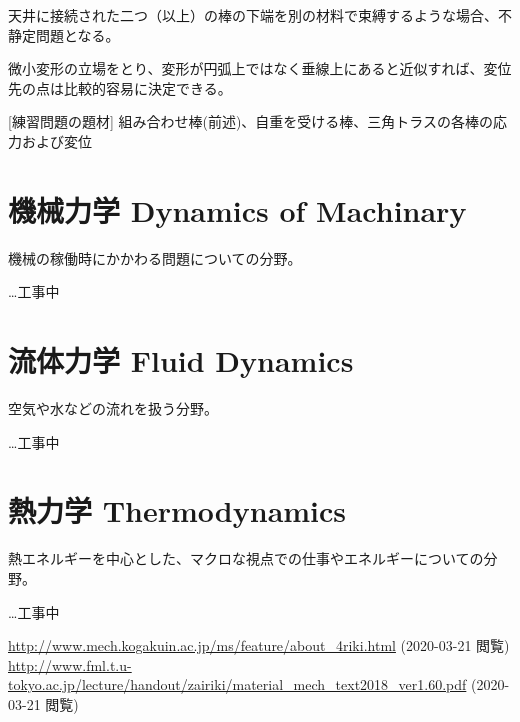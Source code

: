 \documentclass[a4j,10pt,oneside,openany]{jsbook}
\begin{document}
天井に接続された二つ（以上）の棒の下端を別の材料で束縛するような場合、不静定問題となる。

微小変形の立場をとり、変形が円弧上ではなく垂線上にあると近似すれば、変位先の点は比較的容易に決定できる。
\newline

[練習問題の題材]
組み合わせ棒(前述)、自重を受ける棒、三角トラスの各棒の応力および変位


\chapter{機械力学 Dynamics of Machinary}
機械の稼働時にかかわる問題についての分野。

…工事中


\chapter{流体力学 Fluid Dynamics}
空気や水などの流れを扱う分野。

…工事中

\chapter{熱力学 Thermodynamics}
熱エネルギーを中心とした、マクロな視点での仕事やエネルギーについての分野。

…工事中


\begin{thebibliography}{20}
  \url{http://www.mech.kogakuin.ac.jp/ms/feature/about_4riki.html} (2020-03-21 閲覧)
  \url{http://www.fml.t.u-tokyo.ac.jp/lecture/handout/zairiki/material_mech_text2018_ver1.60.pdf} (2020-03-21 閲覧)
\end{thebibliography}
\newpage
\printindex
%
%
\end{document}
